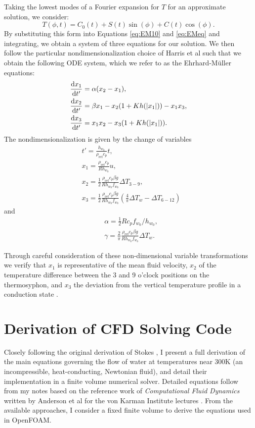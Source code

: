 \documentclass[12pt]{report}
\newcommand{\diff}[2]{\frac{{\rm d}#1}{{\rm d}#2}}
\newcommand{\rhoref}{\rho_{\text{ref}}}
\begin{document}
Taking the lowest modes of a Fourier expansion for $T$ for an approximate solution, we consider:
\begin{equation} T(\phi , t) = C_0 (t) + S(t) \sin (\phi ) + C(t) \cos (\phi) . \end{equation}
By substituting this form into Equations \ref{eq:EM10} and \ref{eq:EMeq} and integrating, we obtain a system of three equations for our solution.
We then follow the particular nondimensionalization choice of Harris et al such that we obtain the following ODE system, which we refer to as the Ehrhard-M\"{u}ller equations:
\begin{align}
& \diff{x_1}{t'} = \alpha (x_2 - x_1),\\
& \diff{x_2}{t'} = \beta x_1 - x_2 (1 + Kh(|x_1|)) - x_1x_3,\\
& \diff{x_3}{t'} = x_1x_2 - x_3 (1 + Kh(|x_1|)) .\end{align}
The nondimensionalization is given by the change of variables
\begin{align}
& t' = \frac{h_{w_0}}{\rhoref c_p}t,\\
& x_1 = \frac{\rhoref c_p }{R h_{w_0}} u, \\
& x_2 = \frac{1}{2} \frac{\rhoref c_p \beta g}{ R h_{w_0} f_{w_0}} \Delta T_{3-9}, \\
& x_3 = \frac{1}{2} \frac{\rhoref c_p \beta g}{ R h_{w_0} f_{w_0}} \left ( \frac{4}{\pi} \Delta T_w - \Delta T_{6-12} \right ) 
\end{align}
and
\begin{align}
& \alpha = \frac{1}{2} R c_p f_{w_0} / h_{w_0} ,\\
& \gamma = \frac{2}{\pi} \frac{\rhoref c_p \beta g}{Rh_{w_0} f_{w_0}} \Delta T_w. \end{align}

Through careful consideration of these non-dimensional variable transformations we verify that $x_1$ is representative of the mean fluid velocity, $x_2$ of the temperature difference between the 3 and 9 o'clock positions on the thermosyphon, and $x_3$ the deviation from the vertical temperature profile in a conduction state .

\chapter{Derivation of CFD Solving Code}

Closely following the original derivation of Stokes , I present a full derivation of the main equations governing the flow of water at temperatures near 300K (an incompressible, heat-conducting, Newtonian fluid), and detail their implementation in a finite volume numerical solver.
Detailed equations follow from my notes based on the reference work of {\em Computational Fluid Dynamics} written by Anderson et al for the von Karman Institute lectures .
From the available approaches, I consider a fixed finite volume to derive the equations used in OpenFOAM.
\end{document}
